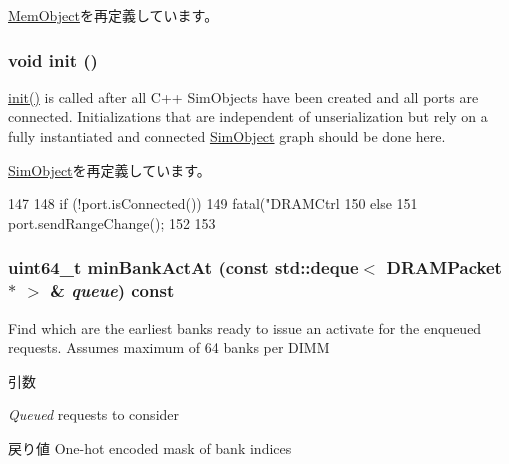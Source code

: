 \hyperlink{classMemObject_ac918a145092d7514ebc6dbd952dceafb}{MemObject}を再定義しています。\hypertarget{classDRAMCtrl_a02fd73d861ef2e4aabb38c0c9ff82947}{
\subsubsection[{init}]{\setlength{\rightskip}{0pt plus 5cm}void init ()}}
\label{classDRAMCtrl_a02fd73d861ef2e4aabb38c0c9ff82947}
\hyperlink{classDRAMCtrl_a02fd73d861ef2e4aabb38c0c9ff82947}{init()} is called after all C++ SimObjects have been created and all ports are connected. Initializations that are independent of unserialization but rely on a fully instantiated and connected \hyperlink{classSimObject}{SimObject} graph should be done here. 

\hyperlink{classSimObject_a02fd73d861ef2e4aabb38c0c9ff82947}{SimObject}を再定義しています。


\begin{DoxyCode}
147 {
148     if (!port.isConnected()) {
149         fatal("DRAMCtrl %
150     } else {
151         port.sendRangeChange();
152     }
153 }
\end{DoxyCode}
\hypertarget{classDRAMCtrl_a29301d0e29279a6e233f15c13959b0de}{
\subsubsection[{minBankActAt}]{\setlength{\rightskip}{0pt plus 5cm}uint64\_\-t minBankActAt (const {\bf std::deque}$<$ {\bf DRAMPacket} $\ast$ $>$ \& {\em queue}) const}}
\label{classDRAMCtrl_a29301d0e29279a6e233f15c13959b0de}
Find which are the earliest banks ready to issue an activate for the enqueued requests. Assumes maximum of 64 banks per DIMM


\begin{DoxyParams}{引数}
\item[{\em Queued}]requests to consider \end{DoxyParams}
\begin{DoxyReturn}{戻り値}
One-\/hot encoded mask of bank indices 
\end{DoxyReturn}



